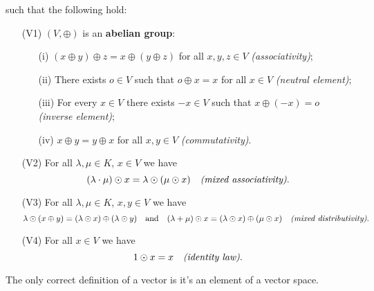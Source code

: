 \documentclass{tufte-handout}
\makeatletter
\renewcommand{\section}{\@startsection{section}%
    {3}{-1.01em}{-3ex \@plus -1ex \@minus -.2ex}%
    {1.5ex \@plus .2ex}
    {\hspace*{-5.5em}\fcolorbox{blue}{blue}{\parbox[c][1.0ex][b]{4em}{\phantom{space}}}
    \normalfont\Large\itshape\color{blue}}}
\makeatother
\begin{document}

such that the following hold:
\begin{itemize}
    \item[(V1)] $(V, \oplus)$ is an \textbf{abelian group}:
    \begin{itemize}
        \item[(i)] $(x \oplus y) \oplus z = x \oplus (y \oplus z)$ for all $x, y, z \in V$ \hfill \textit{(associativity)};
        \item[(ii)] There exists $o \in V$ such that $o \oplus x = x$ for all $x \in V$ \hfill \textit{(neutral element)};
        \item[(iii)] For every $x \in V$ there exists $-x \in V$ such that $x \oplus (-x) = o$ \hfill \textit{(inverse element)};
        \item[(iv)] $x \oplus y = y \oplus x$ for all $x, y \in V$ \hfill \textit{(commutativity)}.
    \end{itemize}
    \item[(V2)] For all $\lambda, \mu \in K$, $x \in V$ we have
    \[
    (\lambda \cdot \mu) \odot x = \lambda \odot (\mu \odot x) \quad \text{\textit{(mixed associativity)}}.
    \]
    \item[(V3)] For all $\lambda, \mu \in K$, $x, y \in V$ we have
    \[
    \lambda \odot (x \oplus y) = (\lambda \odot x) \oplus (\lambda \odot y) \quad \text{and} \quad (\lambda + \mu) \odot x = (\lambda \odot x) \oplus (\mu \odot x) \quad \text{\textit{(mixed distributivity)}}.
    \]
    \item[(V4)] For all $x \in V$ we have
    \[
    1 \odot x = x \quad \text{\textit{(identity law)}}.
    \]
\end{itemize}

The only correct definition of a vector is it's an element of a vector space.


\makeatletter
  \renewcommand{\section}{\@startsection{section}%
    {3}{0.8em}{-3ex \@plus -1ex \@minus -.2ex}%
    {1.5ex \@plus .2ex}
    {\hspace*{-5.5em}\fcolorbox{Periwinkle}{Periwinkle}{\parbox[c][1.0ex][b]{4em}{\phantom{space}}}
    \normalfont\Large\itshape\color{blue}}}
\makeatother



\end{document}
